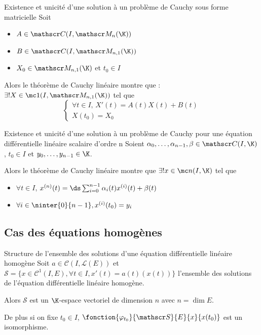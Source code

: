 \begin{corollairent}{Existence et unicité d'une solution à un problème de Cauchy sous forme matricielle}{}
    Soit 
    \begin{itemize}
        \item $A \in \mathscr C(I, \mathscr M_n(\K))$
        \item $B \in \mathscr C(I, \mathscr M_{n,1}(\K))$
        \item $X_0 \in \mathscr M_{n,1}(\K)$ et $t_0 \in I$
    \end{itemize}

    Alors le théorème de Cauchy linéaire montre que :  
    $\exists ! X \in \mc 1(I, \mathscr M_{n,1}(\K))$ tel que 
    $$\begin{cases}
        \forall t \in I, \, X'(t) = A(t) X(t) + B(t) \\
        X(t_0) = X_0
    \end{cases}$$
\end{corollairent}

\begin{theorement}{Existence et unicité d'une solution à un problème de Cauchy pour une équation différentielle linéaire scalaire d'ordre n}{}
    Soient $\alpha_0, \dots, \alpha_{n-1}, \beta \in \mathscr C(I, \K)$, $t_0 \in I$ et $y_0, \dots, y_{n-1} \in \K$.

    Alors le théorème de Cauchy linéaire montre que $\exists ! x \in \mc n (I, \K)$ 
    tel que 
    
    \begin{itemize}
        \item $\forall t \in I$, $x^{(n)}(t) = \ds \sum_{i = 0}^{n - 1} \alpha_i(t) x^{(i)}(t) + \beta(t)$
        \item $\forall i \in \ninter{0}{n - 1}, x^{(i)}(t_0) = y_i$
    \end{itemize} 
\end{theorement}

\subsection{Cas des équations homogènes}


\lvspace \avspace \begin{theorement}{Structure de l'ensemble des solutions d'une équation différentielle linéaire homogène}{}
    Soit $a \in \mathscr C(I, \mathscr L(E))$ et $\mathscr S = \{ x \in \mathscr C^1(I, E), \forall t \in I, x'(t) = a(t)(x(t)) \}$ 
    l'ensemble des solutions de l'équation différentielle linéaire homogène.

    Alors $\mathscr S$ est un $\K$-espace vectoriel de dimension $n$ avec $n = \dim E$. 

    De plus si on fixe $t_0 \in I$, $\fonction{\varphi_{t_0}}{\mathscr S}{E}{x}{x(t_0)}$ est un isomorphisme. 
\end{theorement}

